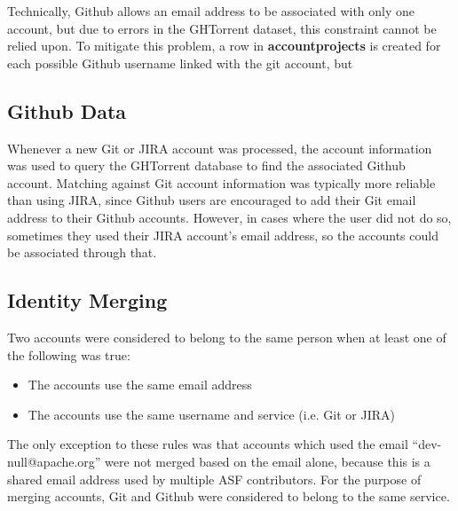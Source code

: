 Technically, Github allows an email address to be associated with only one account, but due to errors in the GHTorrent dataset, this constraint cannot be relied upon. To mitigate this problem, a row in \textbf{accountprojects} is created for each possible Github username linked with the git account, but
\subsection{Github Data}
Whenever a new Git or JIRA account was processed, the account information was used to query the GHTorrent database to find the associated Github account. Matching against Git account information was typically more reliable than using JIRA, since Github users are encouraged to add their Git email address to their Github accounts. However, in cases where the user did not do so, sometimes they used their JIRA account's email address, so the accounts could be associated through that.
\subsection{Identity Merging}
Two accounts were considered to belong to the same person when at least one of the following was true:
\begin{itemize}
	\item The accounts use the same email address
	\item The accounts use the same username and service (i.e. Git or JIRA)
\end{itemize}
The only exception to these rules was that accounts which used the email ``dev-null@apache.org'' were not merged based on the email alone, because this is a shared email address used by multiple ASF contributors. For the purpose of merging accounts, Git and Github were considered to belong to the same service.